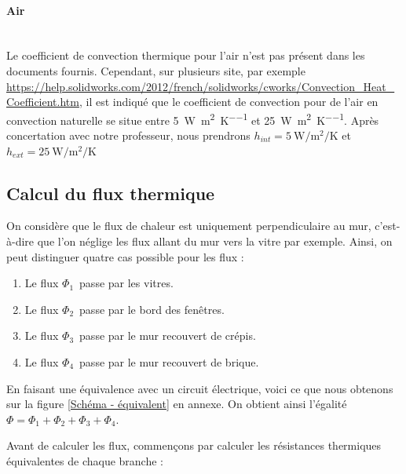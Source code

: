 \documentclass[12pt, a4paper]{article}
\newcommand{\hInt}{\ensuremath{h_{int}}}
\newcommand{\hExt}{\ensuremath{h_{ext}}}
\newcommand{\phiUn}{\ensuremath{\Phi_{1}}}
\newcommand{\phiDeux}{\ensuremath{\Phi_{2}}}
\newcommand{\phiTrois}{\ensuremath{\Phi_{3}}}
\newcommand{\phiQuatre}{\ensuremath{\Phi_{4}}}
\begin{document}
\paragraph{Air} \phantom{.} \\

Le coefficient de convection thermique pour l'air n'est pas présent dans les documents fournis. Cependant, sur plusieurs site, par exemple \url{https://help.solidworks.com/2012/french/solidworks/cworks/Convection_Heat_Coefficient.htm}, il est indiqué que le coefficient de convection pour de l'air en convection naturelle se situe entre \SI{5}{\watt\per\meter\squared\per\kelvin} et \SI{25}{\watt\per\meter\squared\per\kelvin}. Après concertation avec notre professeur, nous prendrons $\boxed{\hInt = \SI{5}{\watt\per\meter\squared\per\kelvin} }$ et $\boxed{\hExt = \SI{25}{\watt\per\meter\squared\per\kelvin} }$

\subsection{Calcul du flux thermique}

On considère que le flux de chaleur est uniquement perpendiculaire au mur, c'est-à-dire que l'on néglige les flux allant du mur vers la vitre par exemple. Ainsi, on peut distinguer quatre cas possible pour les flux :

\begin{enumerate}
\item Le flux \phiUn\ passe par les vitres.
\item Le flux \phiDeux\ passe par le bord des fenêtres.
\item Le flux \phiTrois\ passe par le mur recouvert de crépis.
\item Le flux \phiQuatre\ passe par le mur recouvert de brique.
\end{enumerate}

En faisant une équivalence avec un circuit électrique, voici ce que nous obtenons sur la figure \ref{Schéma - équivalent} en annexe. On obtient ainsi l'égalité $\Phi = \phiUn + \phiDeux + \phiTrois + \phiQuatre$.

Avant de calculer les flux, commençons par calculer les résistances thermiques équivalentes de chaque branche : 

\bigskip
\end{document}
